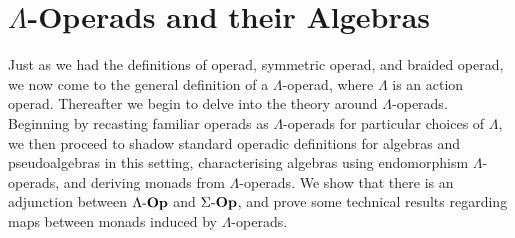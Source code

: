 
\section{\texorpdfstring{$\Lambda$}{L}-Operads and their Algebras}

Just as we had the definitions of operad, symmetric operad, and braided operad, we now come to the general definition of a $\Lambda$-operad, where $\Lambda$ is an action operad. Thereafter we begin to delve into the theory around $\Lambda$-operads. Beginning by recasting familiar operads as $\Lambda$-operads for particular choices of $\Lambda$, we then proceed to shadow standard operadic definitions for algebras and pseudoalgebras in this setting, characterising algebras using endomorphism $\Lambda$-operads, and deriving monads from $\Lambda$-operads. We show that there is an adjunction between $\Lambda\mbox{-}\mathbf{Op}$ and $\Sigma\mbox{-}\mathbf{Op}$, and prove some technical results regarding maps between monads induced by $\Lambda$-operads.


